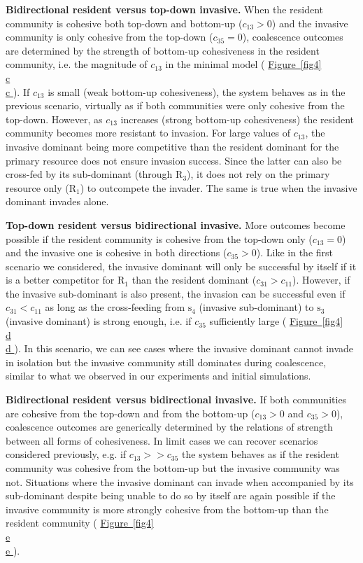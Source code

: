 \documentclass[a4paper,10pt]{article}
\newcommand{\figref}[2][]{%
  \hyperref[{#2}]{%
    Figure~\ref*{#2}%
    \ifx\\#1\\%
    \else
      #1%
    \fi
  }%
}
\begin{document}
\textbf{Bidirectional resident versus top-down invasive.}
When
the resident community is cohesive both top-down and bottom-up ($c_{13}>0$)
and the invasive community is only cohesive from the top-down ($c_{35}=0$),
coalescence outcomes
are determined by the strength of bottom-up cohesiveness in the resident community,
i.e. the magnitude of $c_{13}$ in the minimal model
(\figref[c]{fig4}).
If $c_{13}$ is small (weak bottom-up cohesiveness), the system behaves as in the previous scenario,
virtually as if both communities were only cohesive from the top-down.
However, as $c_{13}$ increases (strong bottom-up cohesiveness) the resident community becomes more
resistant to invasion.
For large values of $c_{13}$, the invasive dominant being more competitive than the resident
dominant for the primary resource does not ensure invasion success.
Since the latter can also be cross-fed by its sub-dominant (through $\mathrm{R}_3$),
it does not rely on the primary resource only ($\mathrm{R}_1$) to outcompete the invader.
The same is true when the invasive dominant invades alone.

\textbf{Top-down resident versus bidirectional invasive.}
More outcomes become possible if the resident community is cohesive from the top-down only ($c_{13}=0$)
and the invasive one is cohesive in both directions ($c_{35}>0$).
Like in the first scenario we considered, the invasive dominant will only be successful by itself if it is a better
competitor for $\mathrm{R}_1$ than the resident dominant ($c_{31}>c_{11}$).
However, if the invasive sub-dominant is also present, the invasion can be successful even if $c_{31}<c_{11}$
as long as the cross-feeding from $\mathrm{s}_4$ (invasive sub-dominant) to $\mathrm{s}_3$ (invasive dominant)
is strong enough, i.e. if $c_{35}$ sufficiently large
(\figref[d]{fig4}).
In this scenario, we can see cases where the invasive dominant cannot invade in isolation but
the invasive community still dominates during coalescence,
similar to what we observed in our experiments and initial simulations.

\textbf{Bidirectional resident versus bidirectional invasive.}
If both communities are cohesive from the top-down and from the bottom-up ($c_{13}>0$ and $c_{35}>0$),
coalescence outcomes are generically determined by the relations of strength between
all forms of cohesiveness.
In limit cases we can recover scenarios considered previously, e.g. if $c_{13} >> c_{35}$ the system
behaves as if the resident community was cohesive from the bottom-up but the invasive community was not.
Situations where the invasive dominant can invade when accompanied by its sub-dominant despite
being unable to do so by itself are again possible
if the invasive community is more strongly cohesive from the bottom-up than the resident community
(\figref[e]{fig4}).
\end{document}
